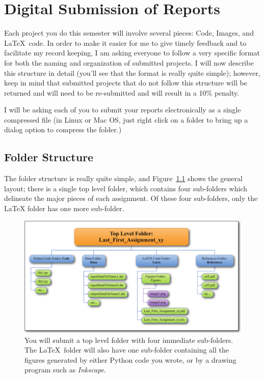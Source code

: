 \chapter{Digital Submission of Reports}
\label{app:submission} %


Each project you do this semester will involve several pieces: Code, Images, and \LaTeX\ code. 
In order to make it easier for me to give timely feedback and to facilitate my record keeping, I am asking everyone
to follow a very specific format for both the naming and organization of submitted projects. I will now describe this structure in detail (you'll see that the format is really quite simple); however, keep in mind that
submitted projects that do not follow this structure will be returned and will need to be re-submitted
and will result in a 10\% penalty. 

I will be asking each of you to submit your reports electronically as a single compressed file (in Linux or Mac OS, just right click on a folder to bring up a dialog option to compress the folder.) 

\section{Folder Structure}\label{sec:Folders}
The folder structure is really quite simple, and Figure~\ref{fig:FolderScheme} shows the general layout; there is a single top level folder, which contains four sub-folders which delineate the major pieces of each assignment. Of these four sub-folders, only the LaTeX folder has one more sub-folder. 
\begin{figure}[htb]
  \includegraphics[width=\linewidth]{Figures/digitalSubmission/FolderScheme.pdf}%
  \caption{You will submit a top level folder with four immediate sub-folders.
  The \LaTeX\ folder will also have one sub-folder containing all the figures generated by either Python code you wrote, or by a drawing program such as \emph{Inkscape}.}
  \label{fig:FolderScheme}
\end{figure}

